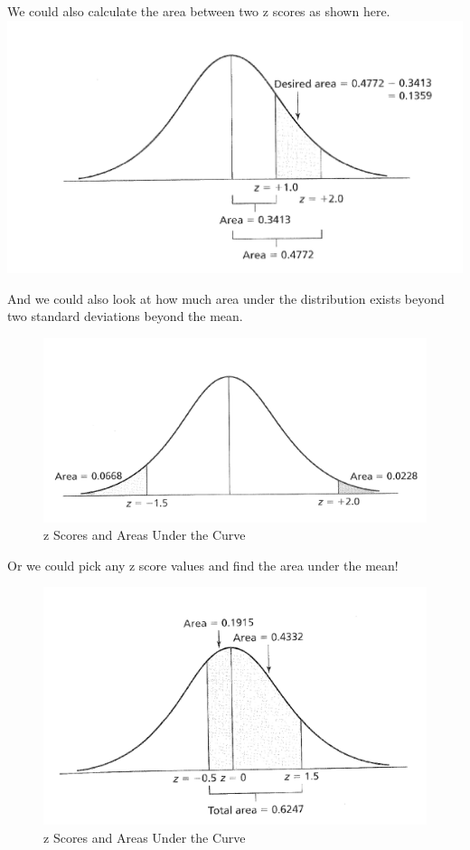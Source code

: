 \documentclass[]{book}
\theoremstyle{definition}
\theoremstyle{definition}
\theoremstyle{definition}
\theoremstyle{remark}
\begin{document}
We could also calculate the area between two z scores as shown here.
\includegraphics{img/hickszscores2.png}

And we could also look at how much area under the distribution exists
beyond two standard deviations beyond the mean.

\begin{figure}
\centering
\includegraphics{img/hickszscores3.png}
\caption{z Scores and Areas Under the Curve}
\end{figure}

Or we could pick any z score values and find the area under the mean!

\begin{figure}
\centering
\includegraphics{img/hickszscores4.png}
\caption{z Scores and Areas Under the Curve}
\end{figure}
\end{document}
